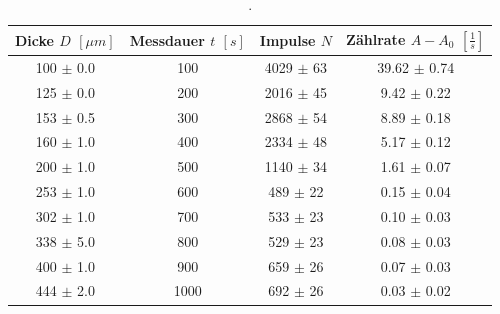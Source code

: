 \begin{table}[H]
  \begin{center}
    \caption{.}
    \label{tab:tres}
    \begin{tabular}{c|c|c|c} 
      \textbf{Dicke $D$ $[\mu m]$} & \textbf{Messdauer $t$ $[s]$} & \textbf{Impulse $N$} & \textbf{Zählrate $A - A_0$ $[\frac{1}{s}]$}\\
      \hline
      100 $\pm$ 0.0 & 100 & 4029 $\pm$ 63 & 39.62 $\pm$ 0.74\\
      125 $\pm$ 0.0 & 200 & 2016 $\pm$ 45 & 9.42 $\pm$ 0.22\\
      153 $\pm$ 0.5 & 300 & 2868 $\pm$ 54 & 8.89 $\pm$ 0.18\\
      160 $\pm$ 1.0 & 400 & 2334 $\pm$ 48 & 5.17 $\pm$ 0.12\\
      200 $\pm$ 1.0 & 500 & 1140 $\pm$ 34 & 1.61 $\pm$ 0.07\\
      253 $\pm$ 1.0 & 600 & 489 $\pm$ 22 & 0.15 $\pm$ 0.04\\
      302 $\pm$ 1.0 & 700 & 533 $\pm$ 23 & 0.10 $\pm$ 0.03\\
      338 $\pm$ 5.0 & 800 & 529 $\pm$ 23 & 0.08 $\pm$ 0.03\\
      400 $\pm$ 1.0 & 900 & 659 $\pm$ 26 & 0.07 $\pm$ 0.03\\
      444 $\pm$ 2.0 & 1000 & 692 $\pm$ 26 & 0.03 $\pm$ 0.02
    \end{tabular}
  \end{center}
\end{table}

